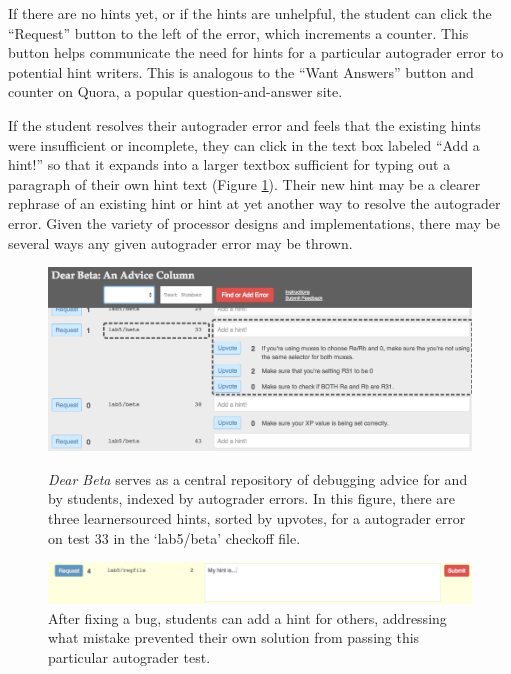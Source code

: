 If there are no hints yet, or if the hints are unhelpful, the student can click the ``Request'' button to the left of the error, which increments a counter. This button helps communicate the need for hints for a particular autograder error to potential hint writers. This is analogous to the ``Want Answers'' button and counter on Quora, a popular question-and-answer site. 

If the student resolves their autograder error and feels that the existing hints were insufficient or incomplete, they can click in the text box labeled ``Add a hint!'' so that it expands into a larger textbox sufficient for typing out a paragraph of their own hint text (Figure \ref{fig:contrib}). Their new hint may be a clearer rephrase of an existing hint or hint at yet another way to resolve the autograder error. Given the variety of processor designs and implementations, there may be several ways any given autograder error may be thrown. 

\begin{figure}
\centering
\includegraphics[width=1.0\columnwidth]{Body/figures/classoverflow/hints_modified.png}
\caption{{\it Dear Beta} serves as a central repository of debugging advice for and by students, indexed by autograder errors. In this figure, there are three learnersourced hints, sorted by upvotes, for a autograder error on test 33 in the `lab5/beta' checkoff file.}
\label{fig:hints}

\bigskip
\centering
\includegraphics[width=1.0\columnwidth]{Body/figures/classoverflow/contrib_shortened.png}
\caption{After fixing a bug, students can add a hint for others, addressing what mistake prevented their own solution from passing this particular autograder test.}
\label{fig:contrib}
\end{figure}

